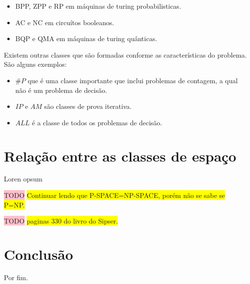 \documentclass[submission,copyright,creativecommons]{eptcs}
\begin{document}
\begin{itemize}
    \item BPP, ZPP e RP em máquinas de turing probabilisticas.
    \item AC e NC em circuítos booleanos.
    \item BQP e QMA em máquinas de turing quânticas.
\end{itemize}

Existem outras classes que são formadas conforme as características do problema. São alguns exemplos\cite{wiki}:

\begin{itemize}
    \item $\#P$ que é uma classe importante que inclui problemas de contagem, a qual não é um problema de decisão.
    \item $IP$ e $AM$ são classes de prova iterativa. 
    \item $ALL$ é a classe de todos os problemas de decisão.
\end{itemize}


\section{Relação entre as classes de espaço}

Loren opsum

\colorbox{pink}{TODO}
\colorbox{yellow}{Continuar lendo que P-SPACE=NP-SPACE, porém não se sabe se P=NP\cite{ufpr2}.}

\colorbox{pink}{TODO}
\colorbox{yellow}{paginas 330 do livro do Sipser\cite{sipser}.}


\section{Conclusão}

Por fim. 

\nocite{*}


\end{document}
